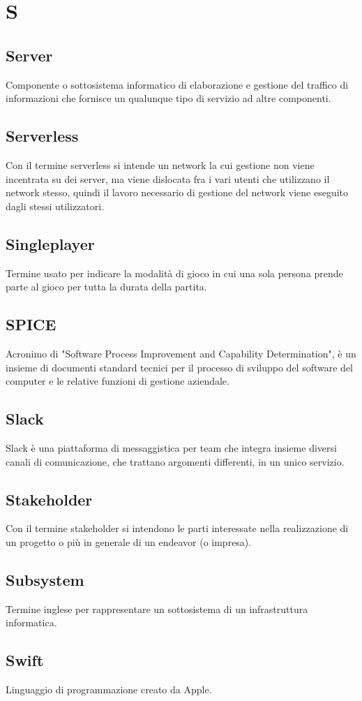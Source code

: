 \section{S}
	\subsection{Server}
		Componente o sottosistema informatico di elaborazione e gestione del traffico di informazioni che fornisce un qualunque tipo di servizio ad altre componenti.
	\subsection{Serverless} 
		Con il termine serverless si intende un network la cui gestione non viene incentrata su dei server, ma viene dislocata fra i vari utenti che utilizzano il network stesso, quindi il lavoro necessario di gestione del network viene eseguito dagli stessi utilizzatori.
	\subsection{Singleplayer}
		Termine usato per indicare la modalità di gioco in cui una sola persona prende parte al gioco per tutta la durata della partita.
	\subsection{SPICE}
		Acronimo di "Software Process Improvement and Capability Determination", è un insieme di documenti standard tecnici per il processo di sviluppo del software del computer e le relative funzioni di gestione aziendale.
	\subsection{Slack}
		Slack è una piattaforma di messaggistica per team che integra insieme diversi canali di comunicazione, che trattano argomenti differenti, in un unico servizio. 	
	\subsection{Stakeholder}  
		Con il termine stakeholder si intendono le parti interessate nella realizzazione di un progetto o più in generale di un endeavor (o impresa).
	\subsection{Subsystem}
		Termine inglese per rappresentare un sottosistema di un infrastruttura informatica.
	\subsection{Swift}
	    Linguaggio di programmazione creato da Apple.

\newpage